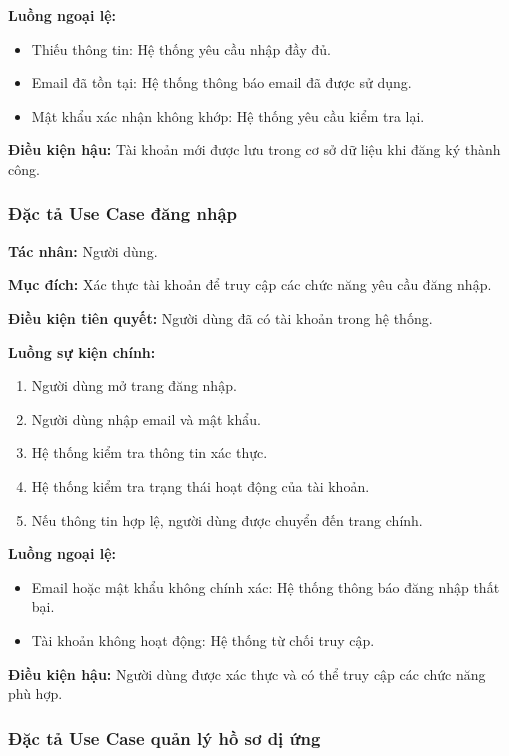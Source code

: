 \textbf{Luồng ngoại lệ:}
\begin{itemize}
	\item Thiếu thông tin: Hệ thống yêu cầu nhập đầy đủ.
	\item Email đã tồn tại: Hệ thống thông báo email đã được sử dụng.
	\item Mật khẩu xác nhận không khớp: Hệ thống yêu cầu kiểm tra lại.
\end{itemize}

\textbf{Điều kiện hậu:} Tài khoản mới được lưu trong cơ sở dữ liệu khi đăng ký thành công.

\subsubsection{Đặc tả Use Case đăng nhập}

\textbf{Tác nhân:} Người dùng.

\textbf{Mục đích:} Xác thực tài khoản để truy cập các chức năng yêu cầu đăng nhập.

\textbf{Điều kiện tiên quyết:} Người dùng đã có tài khoản trong hệ thống.

\textbf{Luồng sự kiện chính:}
\begin{enumerate}
	\item Người dùng mở trang đăng nhập.
	\item Người dùng nhập email và mật khẩu.
	\item Hệ thống kiểm tra thông tin xác thực.
	\item Hệ thống kiểm tra trạng thái hoạt động của tài khoản.
	\item Nếu thông tin hợp lệ, người dùng được chuyển đến trang chính.
\end{enumerate}

\textbf{Luồng ngoại lệ:}
\begin{itemize}
	\item Email hoặc mật khẩu không chính xác: Hệ thống thông báo đăng nhập thất bại.
	\item Tài khoản không hoạt động: Hệ thống từ chối truy cập.
\end{itemize}

\textbf{Điều kiện hậu:} Người dùng được xác thực và có thể truy cập các chức năng phù hợp.

\subsubsection{Đặc tả Use Case quản lý hồ sơ dị ứng}

